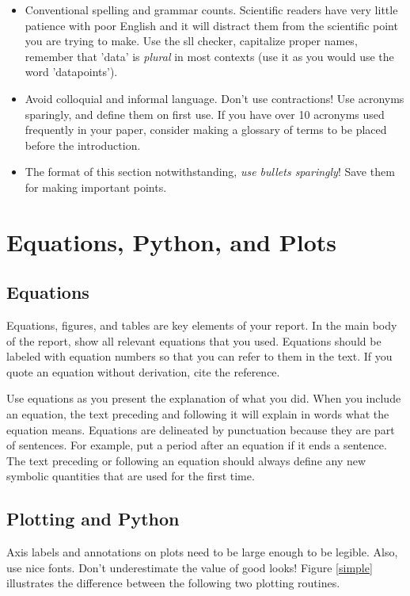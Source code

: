 \documentclass[12pt,preprint]{aastex}
\begin{document}
\begin{itemize}
\item Conventional spelling and grammar counts. Scientific readers have very little patience with poor English and it will distract them from the scientific point you are trying to make. Use the sll checker, capitalize proper names, remember that 'data' is \emph{plural} in most contexts (use it as you would use the word 'datapoints').
\item Avoid colloquial and informal language. Don’t use contractions! Use acronyms sparingly, and define them on first use. If you have over 10 acronyms used frequently in your paper, consider making a glossary of terms to be placed before the introduction.
\item The format of this section notwithstanding, {\it use bullets sparingly}! Save them for making important points.
\end{itemize}

\section{Equations, Python, and Plots} \label{plotting}

\subsection{Equations}

\noindent
Equations, figures, and tables are key elements of your report. In the main body of the report, show all relevant equations that you used. Equations should be labeled with equation numbers so that you can refer to them in the text. If you quote an equation without derivation, cite the reference. 

Use equations as you present the explanation of what you did. When you include an equation, the text preceding and following it will explain in words what the equation means. Equations are delineated by punctuation because they are part of sentences. For example, put a period after an equation if it ends a sentence. The text preceding or following an equation should always define any new symbolic quantities that are used for the first time.

\subsection{Plotting and Python}

\noindent
Axis labels and annotations on plots need to be large
enough to be legible.  Also, use nice fonts. Don't
underestimate the value of good looks! Figure \ref{simple} illustrates
the difference between the following two plotting routines.
\end{document}
